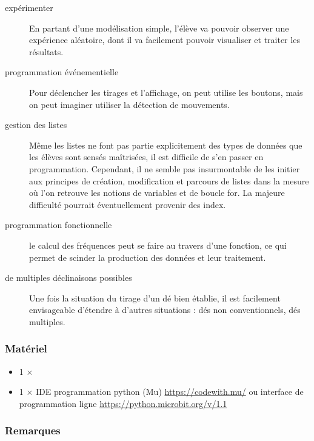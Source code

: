 \begin{description}
    \item [expérimenter] En partant d'une modélisation simple, l'élève va pouvoir observer une expérience aléatoire, dont il va facilement pouvoir visualiser et traiter les résultats.
    \item [programmation événementielle] Pour déclencher les tirages et l'affichage, on peut utilise les boutons, mais on peut imaginer utiliser la détection de mouvements. 
    \item [gestion des listes] Même les listes ne font pas partie explicitement des types de données que les élèves sont sensés maîtrisées, il est difficile de s'en passer en programmation. Cependant, il ne semble pas insurmontable de les initier aux principes de création, modification et parcours de listes dans la mesure où l'on retrouve les notions de variables et de boucle for. La majeure difficulté pourrait éventuellement provenir des index.
    \item [programmation fonctionnelle] le calcul des fréquences peut se faire au travers d'une fonction, ce qui permet de scinder la production des données et leur traitement.
    \item [de multiples déclinaisons possibles] Une fois la situation du tirage d'un dé bien établie, il est facilement envisageable d'étendre à d'autres situations : dés non conventionnels, dés multiples.
\end{description}


\subsubsection{Matériel}
\begin{itemize}
    \item 1 $\times$ \matosMb 
    \item 1 $\times$ IDE programmation python (Mu) \url{https://codewith.mu/} ou interface de programmation ligne \url{https://python.microbit.org/v/1.1}
\end{itemize}



\subsubsection{Remarques}


